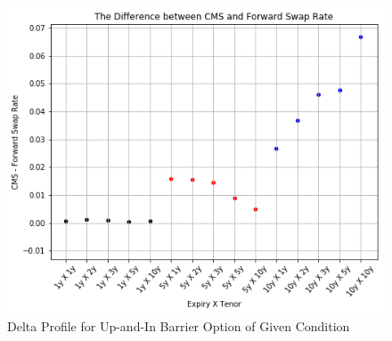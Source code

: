 \documentclass{article}
\begin{document}
	\begin{figure}[ht]
		\centering
		\includegraphics[scale=0.5]{CMS_FSR.png}
		\caption{Delta Profile for Up-and-In Barrier Option of Given Condition}
	\end{figure}
\end{document}
